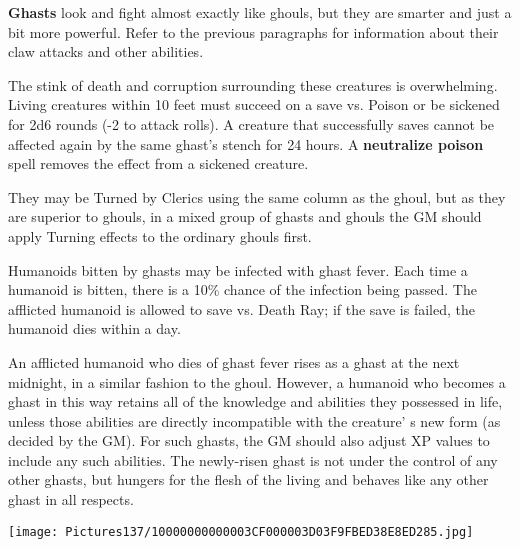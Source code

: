 \documentclass[a4paper,twoside,openany,10pt]{book}
\begin{document}
\begin{multicols}{2}
\textbf{Ghasts} look and fight almost exactly like ghouls, but they are smarter and just a bit more powerful. Refer to the previous paragraphs for information about their claw attacks and other abilities.

The stink of death and corruption surrounding these creatures is overwhelming. Living creatures within 10 feet must succeed on a save vs. Poison or be sickened for 2d6 rounds (-2 to attack rolls). A creature that successfully saves cannot be affected again by the same ghast's stench for 24 hours. A \textbf{neutralize poison} spell removes the effect from a sickened creature.

They may be Turned by Clerics using the same column as the ghoul, but as they are superior to ghouls, in a mixed group of ghasts and ghouls the GM should apply Turning effects to the ordinary ghouls first.

Humanoids bitten by ghasts may be infected with ghast fever. Each time a humanoid is bitten, there is a 10\% chance of the infection being passed. The afflicted humanoid is allowed to save vs. Death Ray; if the save is failed, the humanoid dies within a day.

An afflicted humanoid who dies of ghast fever rises as a ghast at the next midnight, in a similar fashion to the ghoul. However, a humanoid who becomes a ghast in this way retains all of the knowledge and abilities they possessed in life, unless those abilities are directly incompatible with the creature' s new form (as decided by the GM). For such ghasts, the GM should also adjust XP values to include any such abilities. The newly-risen ghast is not under the control of any other ghasts, but hungers for the flesh of the living and behaves like any other ghast in all respects.

\end{multicols}

\begin{center}
	\texttt{[image: Pictures137/10000000000003CF000003D03F9FBED38E8ED285.jpg]}
\end{center}
\end{document}
